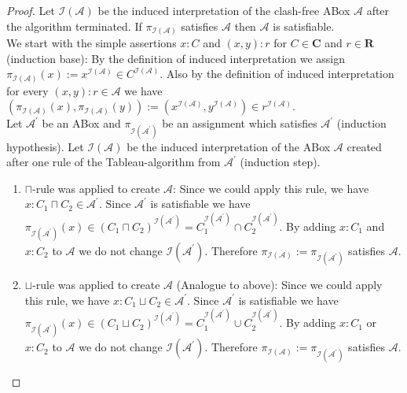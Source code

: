 \documentclass[a4paper,11pt]{scrartcl}
\theoremstyle{break}
\theoremstyle{definition}
\begin{document}
\begin{proof}
Let $\mathcal{I}(\mathcal{A})$ be the induced interpretation of the clash-free ABox $\mathcal{A}$ after the algorithm terminated. If $\pi_{\mathcal{I}(\mathcal{A})}$ satisfies $\mathcal{A}$ then $\mathcal{A}$ is satisfiable.\\
We start with the simple assertions $x:C$ and $(x,y):r$ for $C\in\mathbf{C}$ and $r\in\mathbf{R}$ (induction base): By the definition of induced interpretation we assign $\pi_{\mathcal{I}(\mathcal{A})}(x):=x^{\mathcal{I}(\mathcal{A})}\in C^{\mathcal{I}(\mathcal{A})}$. Also by the definition of induced interpretation for every $(x,y):r\in \mathcal{A}$ we have $(\pi_{\mathcal{I}(\mathcal{A})}(x),\pi_{\mathcal{I}(\mathcal{A})}(y)):=(x^{\mathcal{I}(\mathcal{A})},y^{\mathcal{I}(\mathcal{A})})\in r^{\mathcal{I}(\mathcal{A})}$.\\
Let $\mathcal{A}^\prime$ be an ABox and $\pi_{\mathcal{I}(\mathcal{A}^\prime)}$ be an assignment which satisfies $\mathcal{A}^\prime$ (induction hypothesis).
Let $\mathcal{I}(\mathcal{A})$ be the induced interpretation of the ABox $\mathcal{A}$ created after one rule of the Tableau-algorithm from $\mathcal{A}^\prime$ (induction step).\\
\begin{enumerate}
\item $\sqcap$-rule was applied to create $\mathcal{A}$: Since we could apply this rule, we have $x:C_1\sqcap C_2\in\mathcal{A}^\prime$. Since $\mathcal{A}^\prime$ is satisfiable we have $\pi_{\mathcal{I}(\mathcal{A}^\prime)}(x)\in (C_1\sqcap C_2)^{\mathcal{I}(\mathcal{A}^\prime)}=C_1^{\mathcal{I}(\mathcal{A}^\prime)}\cap C_2^{\mathcal{I}(\mathcal{A}^\prime)}$. By adding $x:C_1$ and $x:C_2$ to $\mathcal{A}$ we do not change $\mathcal{I}(\mathcal{A}^\prime)$. Therefore $\pi_{\mathcal{I}(\mathcal{A})}:=\pi_{\mathcal{I}(\mathcal{A}^\prime)}$ satisfies $\mathcal{A}$.
\item $\sqcup$-rule was applied to create $\mathcal{A}$ (Analogue to above): Since we could apply this rule, we have $x:C_1\sqcup C_2\in\mathcal{A}^\prime$. Since $\mathcal{A}^\prime$ is satisfiable we have $\pi_{\mathcal{I}(\mathcal{A}^\prime)}(x)\in (C_1\sqcup C_2)^{\mathcal{I}(\mathcal{A}^\prime)}=C_1^{\mathcal{I}(\mathcal{A}^\prime)}\cup C_2^{\mathcal{I}(\mathcal{A}^\prime)}$. By adding $x:C_1$ or $x:C_2$ to $\mathcal{A}$ we do not change $\mathcal{I}(\mathcal{A}^\prime)$. Therefore $\pi_{\mathcal{I}(\mathcal{A})}:=\pi_{\mathcal{I}(\mathcal{A}^\prime)}$ satisfies $\mathcal{A}$.

\end{enumerate}
\end{proof}
\end{document}
